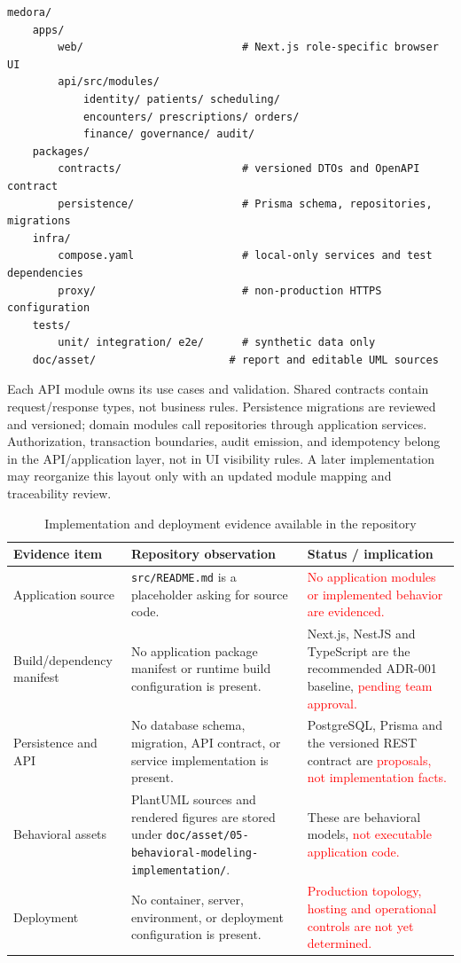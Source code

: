 \documentclass[a4paper,12pt]{article}
\newcommand{\weak}[1]{\textcolor{red}{#1}}
\begin{document}
\begin{lstlisting}[language={},caption={Proposed source layout for the first implementation},label={lst:proposed-source-layout}]
medora/
    apps/
        web/                         # Next.js role-specific browser UI
        api/src/modules/
            identity/ patients/ scheduling/
            encounters/ prescriptions/ orders/
            finance/ governance/ audit/
    packages/
        contracts/                   # versioned DTOs and OpenAPI contract
        persistence/                 # Prisma schema, repositories, migrations
    infra/
        compose.yaml                 # local-only services and test dependencies
        proxy/                       # non-production HTTPS configuration
    tests/
        unit/ integration/ e2e/      # synthetic data only
    doc/asset/                     # report and editable UML sources
\end{lstlisting}

Each API module owns its use cases and validation. Shared contracts contain request/response types, not business rules. Persistence migrations are reviewed and versioned; domain modules call repositories through application services. Authorization, transaction boundaries, audit emission, and idempotency belong in the API/application layer, not in UI visibility rules. A later implementation may reorganize this layout only with an updated module mapping and traceability review.

\begin{table}[H]
\centering
\small
\renewcommand{\arraystretch}{1.14}
\begin{tabularx}{\textwidth}{@{}P{0.25\textwidth}P{0.38\textwidth}Y@{}}
\toprule
Evidence item & Repository observation & Status / implication \\
\midrule
Application source & \texttt{src/README.md} is a placeholder asking for source code. & \weak{No application modules or implemented behavior are evidenced.} \\
Build/dependency manifest & No application package manifest or runtime build configuration is present. & Next.js, NestJS and TypeScript are the recommended ADR-001 baseline, \weak{pending team approval.} \\
Persistence and API & No database schema, migration, API contract, or service implementation is present. & PostgreSQL, Prisma and the versioned REST contract are \weak{proposals, not implementation facts.} \\
Behavioral assets & PlantUML sources and rendered figures are stored under \texttt{doc/asset/05-behavioral-modeling-implementation/}. & These are behavioral models, \weak{not executable application code.} \\
Deployment & No container, server, environment, or deployment configuration is present. & \weak{Production topology, hosting and operational controls are not yet determined.} \\
\bottomrule
\end{tabularx}
\caption{Implementation and deployment evidence available in the repository}
\label{tab:implementation-evidence}
\end{table}
\end{document}

